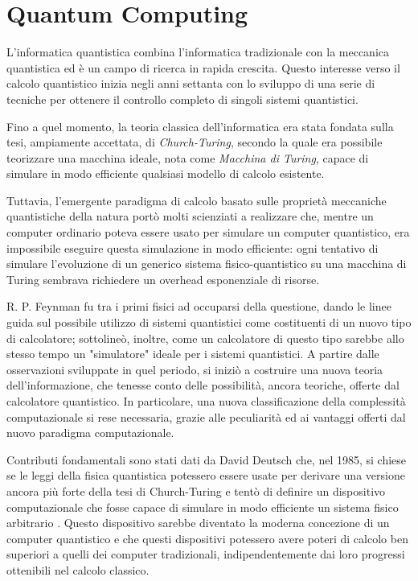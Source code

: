 \chapter{Quantum Computing}
L'informatica quantistica combina l'informatica tradizionale con la meccanica quantistica ed è un campo di ricerca in rapida crescita. Questo interesse verso il calcolo quantistico inizia negli anni settanta con lo sviluppo di una serie di tecniche per ottenere il controllo completo di singoli sistemi quantistici. 

Fino a quel momento, la teoria classica dell'informatica era stata fondata sulla tesi, ampiamente accettata, di \textit{Church-Turing}, secondo la quale era possibile teorizzare una macchina ideale, nota come \textit{Macchina di Turing}, capace di simulare in modo efficiente qualsiasi modello di calcolo esistente.

Tuttavia, l'emergente paradigma di calcolo basato sulle proprietà meccaniche quantistiche della natura portò molti scienziati a realizzare che, mentre un computer ordinario poteva essere usato per simulare un computer quantistico, era impossibile eseguire questa simulazione in modo efficiente: ogni tentativo di simulare l'evoluzione di un generico sistema fisico-quantistico su una macchina di Turing sembrava richiedere un overhead esponenziale di risorse.

R. P. Feynman fu tra i primi fisici ad occuparsi della questione, dando le linee guida sul possibile utilizzo di sistemi quantistici come costituenti di un nuovo tipo di calcolatore; sottolineò, inoltre, come un calcolatore di questo tipo sarebbe allo stesso tempo un "simulatore" ideale per i sistemi quantistici. A partire dalle osservazioni sviluppate in quel periodo, si iniziò a costruire una nuova teoria dell'informazione, che tenesse conto delle possibilità, ancora teoriche, offerte dal calcolatore quantistico. In particolare, una nuova classificazione della complessità computazionale si rese necessaria, grazie alle peculiarità ed ai vantaggi offerti dal nuovo paradigma computazionale.

Contributi fondamentali sono stati dati da David Deutsch che, nel 1985, si chiese se le leggi della fisica quantistica potessero essere usate per derivare una versione ancora più forte della tesi di Church-Turing e tentò di definire un dispositivo computazionale che fosse capace di simulare in modo efficiente un sistema fisico arbitrario \cite{deutsch1985quantum}. Questo dispositivo sarebbe diventato la moderna concezione di un computer quantistico e che questi dispositivi potessero avere poteri di calcolo ben superiori a quelli dei computer tradizionali, indipendentemente dai loro progressi ottenibili nel calcolo classico.

